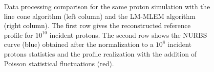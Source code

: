 \begin{figure}
  \caption{Data processing comparison for the same proton simulation with the line cone algorithm (left column) and the LM-MLEM algorithm (right column). The first row gives the reconstructed reference profile for $10^{10}$ incident protons. The second row shows the NURBS curve (blue) obtained after the normalization to a $10^8$ incident protons statistics and the profile realization with the addition of Poisson statistical fluctuations (red).}%
\end{figure}

